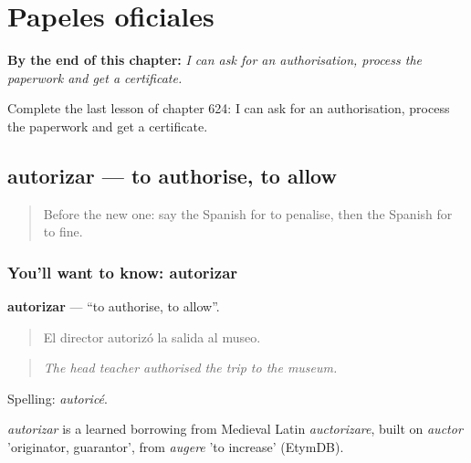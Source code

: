 
\chapter{Papeles oficiales}
\label{ch:es-papeles-oficiales}

\begin{chapteropening}
\textbf{By the end of this chapter:} \emph{I can ask for an authorisation, process the paperwork and get a certificate.}

Complete the last lesson of chapter 624: I can ask for an authorisation, process the paperwork and get a certificate.
\end{chapteropening}

\section[autorizar]{autorizar — to authorise, to allow}

\label{lesson:ES-C624-autorizar}



\begin{quote}
Before the new one: say the Spanish for to penalise, then the Spanish for to fine.
\end{quote}

\subsection*{You'll want to know: autorizar}
\textbf{autorizar} — \textquotedblleft{}to authorise, to allow\textquotedblright{}.

\begin{quote}
El director autorizó la salida al museo.
\end{quote}

\begin{quote}
\emph{The head teacher authorised the trip to the museum.}
\end{quote}

Spelling: \emph{autoricé}.

\begin{cousinweb}
\emph{autorizar} is a learned borrowing from Medieval Latin \emph{auctorizare}, built on \emph{auctor} 'originator, guarantor', from \emph{augere} 'to increase' (EtymDB).
\end{cousinweb}

